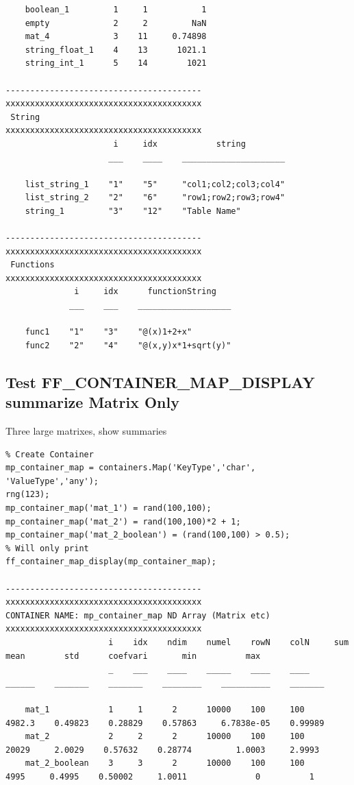 \documentclass[
]{book}
\begin{document}
\begin{verbatim}
    boolean_1         1     1           1
    empty             2     2         NaN
    mat_4             3    11     0.74898
    string_float_1    4    13      1021.1
    string_int_1      5    14        1021

----------------------------------------
xxxxxxxxxxxxxxxxxxxxxxxxxxxxxxxxxxxxxxxx
 String
xxxxxxxxxxxxxxxxxxxxxxxxxxxxxxxxxxxxxxxx
                      i     idx            string        
                     ___    ____    _____________________

    list_string_1    "1"    "5"     "col1;col2;col3;col4"
    list_string_2    "2"    "6"     "row1;row2;row3;row4"
    string_1         "3"    "12"    "Table Name"         

----------------------------------------
xxxxxxxxxxxxxxxxxxxxxxxxxxxxxxxxxxxxxxxx
 Functions
xxxxxxxxxxxxxxxxxxxxxxxxxxxxxxxxxxxxxxxx
              i     idx      functionString   
             ___    ___    ___________________

    func1    "1"    "3"    "@(x)1+2+x"        
    func2    "2"    "4"    "@(x,y)x*1+sqrt(y)"
\end{verbatim}

\hypertarget{test-ff_container_map_display-summarize-matrix-only}{%
\subsection{Test FF\_CONTAINER\_MAP\_DISPLAY summarize Matrix Only}\label{test-ff_container_map_display-summarize-matrix-only}}

Three large matrixes, show summaries

\begin{verbatim}
% Create Container
mp_container_map = containers.Map('KeyType','char', 'ValueType','any');
rng(123);
mp_container_map('mat_1') = rand(100,100);
mp_container_map('mat_2') = rand(100,100)*2 + 1;
mp_container_map('mat_2_boolean') = (rand(100,100) > 0.5);
% Will only print 
ff_container_map_display(mp_container_map);

----------------------------------------
xxxxxxxxxxxxxxxxxxxxxxxxxxxxxxxxxxxxxxxx
CONTAINER NAME: mp_container_map ND Array (Matrix etc)
xxxxxxxxxxxxxxxxxxxxxxxxxxxxxxxxxxxxxxxx
                     i    idx    ndim    numel    rowN    colN     sum       mean        std      coefvari       min          max  
                     _    ___    ____    _____    ____    ____    ______    _______    _______    ________    __________    _______

    mat_1            1     1      2      10000    100     100     4982.3    0.49823    0.28829    0.57863     6.7838e-05    0.99989
    mat_2            2     2      2      10000    100     100      20029     2.0029    0.57632    0.28774         1.0003     2.9993
    mat_2_boolean    3     3      2      10000    100     100       4995     0.4995    0.50002     1.0011              0          1
\end{verbatim}
\end{document}
